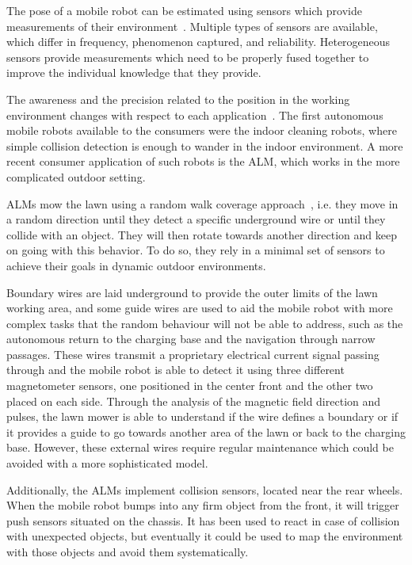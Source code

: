 The pose of a mobile robot can be estimated using sensors which provide measurements of their environment~\cite{autonomous-yasuda}.
Multiple types of sensors are available, which differ in frequency, phenomenon captured, and reliability.
Heterogeneous sensors provide measurements which need to be properly fused together to improve the individual knowledge that they provide.

The awareness and the precision related to the position in the working environment changes with respect to each application~\cite{autonomous-yasuda}.
The first autonomous mobile robots available to the consumers were the indoor cleaning robots, where simple collision detection is enough to wander in the indoor environment.
A more recent consumer application of such robots is the \gls{ALM}, which works in the more complicated outdoor setting.

\glspl{ALM} mow the lawn using a random walk coverage approach~\cite{karol_ardic_conditional_2016}, i.e. they move in a random direction until they detect a specific underground wire or until they collide with an object.
They will then rotate towards another direction and keep on going with this behavior.
To do so, they rely in a minimal set of sensors to achieve their goals in dynamic outdoor environments.

Boundary wires are laid underground to provide the outer limits of the lawn working area, and some guide wires are used to aid the mobile robot with more complex tasks that the random behaviour will not be able to address, such as the autonomous return to the charging base and the navigation through narrow passages.
These wires transmit a proprietary electrical current signal passing through and the mobile robot is able to detect it using three different magnetometer sensors, one positioned in the center front and the other two placed on each side.
Through the analysis of the magnetic field direction and pulses, the lawn mower is able to understand if the wire defines a boundary or if it provides a guide to go towards another area of the lawn or back to the charging base.
However, these external wires require regular maintenance which could be avoided with a more sophisticated model.

Additionally, the \glspl{ALM} implement collision sensors, located near the rear wheels.
When the mobile robot bumps into any firm object from the front, it will trigger push sensors situated on the chassis.
It has been used to react in case of collision with unexpected objects, but eventually it could be used to map the environment with those objects and avoid them systematically.

